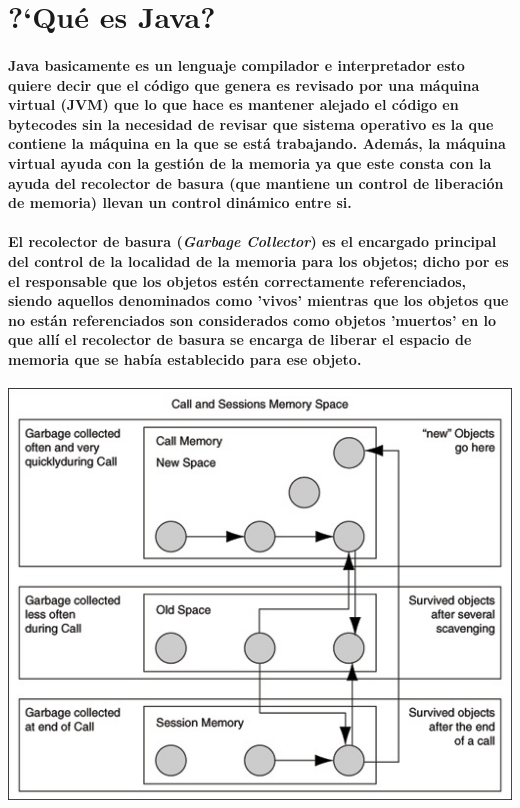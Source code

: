 \documentclass[12pt]{book} %
\begin{document}
\section{?`Qu\'e es Java?}

\paragraph{Java basicamente es un lenguaje compilador e interpretador \cite{ob} esto quiere decir que el c\'odigo que genera es revisado por una m\'aquina virtual (JVM) que lo que hace es mantener alejado el c\'odigo en bytecodes sin la necesidad de revisar que sistema operativo es la que contiene la m\'aquina en la que se est\'a trabajando. Adem\'as, la m\'aquina virtual ayuda con la gesti\'on de la memoria ya que este consta con la ayuda del recolector de basura (que mantiene un control de liberaci\'on de memoria) llevan un control din\'amico entre si.}

\paragraph{El recolector de basura (\textsl{Garbage Collector}) es el encargado principal del control de la localidad de la memoria para los objetos; dicho por \cite{sun} es el responsable que los objetos est\'en correctamente referenciados, siendo aquellos denominados como 'vivos' mientras que los objetos que no est\'an referenciados son considerados como objetos 'muertos' en lo que all\'i el recolector de basura se encarga de liberar el espacio de memoria que se hab\'ia establecido para ese objeto.}

\begin{center}
	\includegraphics[scale=0.8]{garbage.jpg}
\end{center}
\end{document}
